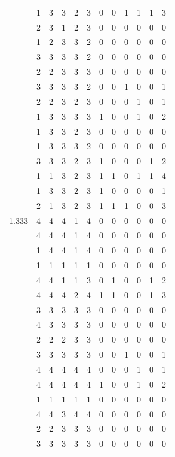 \documentclass[]{msu-thesis}
\theoremstyle{definition}
\theoremstyle{definition}
\theoremstyle{definition}
\theoremstyle{remark}
\begin{document}
\begin{table}
{\begin{tabular}[t]{rrrrrrrrrrrr}
 & 1 & 3 & 3 & 2 & 3 & 0 & 0 & 1 & 1 & 1 & 3\\
 & 2 & 3 & 1 & 2 & 3 & 0 & 0 & 0 & 0 & 0 & 0\\
 & 1 & 2 & 3 & 3 & 2 & 0 & 0 & 0 & 0 & 0 & 0\\
 & 3 & 3 & 3 & 3 & 2 & 0 & 0 & 0 & 0 & 0 & 0\\
 & 2 & 2 & 3 & 3 & 3 & 0 & 0 & 0 & 0 & 0 & 0\\
 & 3 & 3 & 3 & 3 & 2 & 0 & 0 & 1 & 0 & 0 & 1\\
 & 2 & 2 & 3 & 2 & 3 & 0 & 0 & 0 & 1 & 0 & 1\\
 & 1 & 3 & 3 & 3 & 3 & 1 & 0 & 0 & 1 & 0 & 2\\
 & 1 & 3 & 3 & 2 & 3 & 0 & 0 & 0 & 0 & 0 & 0\\
 & 1 & 3 & 3 & 3 & 2 & 0 & 0 & 0 & 0 & 0 & 0\\
 & 3 & 3 & 3 & 2 & 3 & 1 & 0 & 0 & 0 & 1 & 2\\
 & 1 & 1 & 3 & 2 & 3 & 1 & 1 & 0 & 1 & 1 & 4\\
 & 1 & 3 & 3 & 2 & 3 & 1 & 0 & 0 & 0 & 0 & 1\\
 & 2 & 1 & 3 & 2 & 3 & 1 & 1 & 1 & 0 & 0 & 3\\
1.333 & 4 & 4 & 4 & 1 & 4 & 0 & 0 & 0 & 0 & 0 & 0\\
 & 4 & 4 & 4 & 1 & 4 & 0 & 0 & 0 & 0 & 0 & 0\\
 & 1 & 4 & 4 & 1 & 4 & 0 & 0 & 0 & 0 & 0 & 0\\
 & 1 & 1 & 1 & 1 & 1 & 0 & 0 & 0 & 0 & 0 & 0\\
 & 4 & 4 & 1 & 1 & 3 & 0 & 1 & 0 & 0 & 1 & 2\\
 & 4 & 4 & 4 & 2 & 4 & 1 & 1 & 0 & 0 & 1 & 3\\
 & 3 & 3 & 3 & 3 & 3 & 0 & 0 & 0 & 0 & 0 & 0\\
 & 4 & 3 & 3 & 3 & 3 & 0 & 0 & 0 & 0 & 0 & 0\\
 & 2 & 2 & 2 & 3 & 3 & 0 & 0 & 0 & 0 & 0 & 0\\
 & 3 & 3 & 3 & 3 & 3 & 0 & 0 & 1 & 0 & 0 & 1\\
 & 4 & 4 & 4 & 4 & 4 & 0 & 0 & 0 & 1 & 0 & 1\\
 & 4 & 4 & 4 & 4 & 4 & 1 & 0 & 0 & 1 & 0 & 2\\
 & 1 & 1 & 1 & 1 & 1 & 0 & 0 & 0 & 0 & 0 & 0\\
 & 4 & 4 & 3 & 4 & 4 & 0 & 0 & 0 & 0 & 0 & 0\\
 & 2 & 2 & 3 & 3 & 3 & 0 & 0 & 0 & 0 & 0 & 0\\
 & 3 & 3 & 3 & 3 & 3 & 0 & 0 & 0 & 0 & 0 & 0\\

\end{tabular}}
\end{table}
\end{document}
